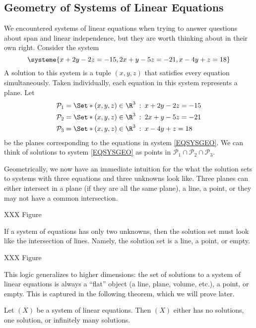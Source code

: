 \subsection{Geometry of Systems of Linear Equations}
We encountered systems of linear equations when trying to answer questions about
span and linear independence, but they are worth thinking about in their own right.
Consider the system
\begin{equation}
\label{EQSYSGEO}
		\systeme{
			x+2y-2z=-15,
			2x+y-5z=-21,
			x-4y+z=18
		}
\end{equation}
A solution to this system is a tuple $(x,y,z)$ that satisfies every equation simultaneously.
Taken individually, each equation in this system represents a plane. Let
\begin{align*}
	\mathcal P_1&=\Set*{(x,y,z)\in\R^3\given x+2y-2z=-15}\\
	\mathcal P_2&=\Set*{(x,y,z)\in\R^3\given 2x+y-5z=-21}\\
	\mathcal P_3&=\Set*{(x,y,z)\in\R^3\given x-4y+z=18}
\end{align*}
be the planes corresponding to the equations in system \eqref{EQSYSGEO}.
We can think of solutions to system \eqref{EQSYSGEO} as points in $\mathcal P_1\cap 
\mathcal P_2\cap \mathcal P_3$.

Geometrically, we now have an immediate intuition for the what the solution
sets to systems with three equations and three unknowns look like. Three planes
can either intersect in a plane (if they are all the same plane), a line, a point,
or they may not have a common intersection.

XXX Figure

If a system of equations has only two unknowns, then the solution set must look
like the intersection of lines. Namely, the solution set is a line, a point, or
empty.

XXX Figure

This logic generalizes to higher dimensions: the set of solutions to a system of linear
equations is always a ``flat'' object (a line, plane, volume, etc.), a point, or empty.
This is captured in the following theorem, which we will prove later.
\begin{theorem}
	Let $(X)$ be a system of linear equations. Then $(X)$ either has
	no solutions, one solution, or infinitely many solutions.
\end{theorem}

